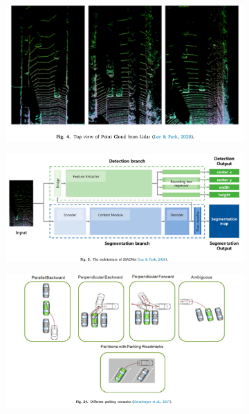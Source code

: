 \begin{figure}[!ht]
    \centering
    \begin{subfigure}{0.4\textwidth}
        \includegraphics[width=\textwidth]{img/12Screenshot_20231106_142954}\label{fig:12}
    \end{subfigure}
    \begin{subfigure}{0.4\textwidth}
        \includegraphics[width=\textwidth]{img/13Screenshot_20231106_143018}\label{fig:13}
    \end{subfigure}
    \begin{subfigure}{0.4\textwidth}
        \includegraphics[width=\textwidth]{img/15Screenshot_20231106_143633}\label{fig:15}

\end{subfigure}
\end{figure}
